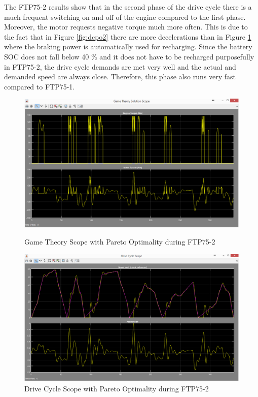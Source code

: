 The FTP75-2 results show that in the second phase of the drive cycle there is a much frequent switching on and off of the engine compared to the first phase. Moreover, the motor requests negative torque much more often. This is due to the fact that in Figure \ref{fig:dcpo2} there are more decelerations than in Figure \ref{fig:dcpo1} where the braking power is automatically used for recharging. Since the battery SOC does not fall below 40 \% and it does not have to be recharged purposefully in FTP75-2, the drive cycle demands are met very well and the actual and demanded speed are always close. Therefore, this phase also runs very fast compared to FTP75-1.

\begin{figure}[hp]
\centering
\includegraphics[scale=0.43]{figures/Pareto/FTP75-2/gameTheory03Juli}
\caption{Game Theory Scope with Pareto Optimality during FTP75-2}
\label{fig:gtpo1}

\includegraphics[scale=0.41]{figures/Pareto/FTP75-2/driveCycle03Juli}
\caption{Drive Cycle Scope with Pareto Optimality during FTP75-2}
\label{fig:dcpo1}
\end{figure}


